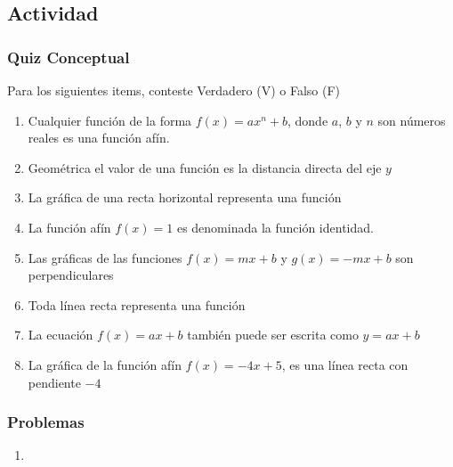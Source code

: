 \documentclass[letterpaper,11pt,twoside]{article}
\begin{document}
\begin{multicols}{2}
 \subsection*{Actividad}
 \subsubsection*{Quiz Conceptual}
 Para los siguientes items, conteste Verdadero (V) o Falso (F)
 \begin{enumerate}
 \item Cualquier función de la forma $f(x)=ax^{n}+b$, donde $a$, $b$ y $n$ son números reales es una función afín.
 \item Geométrica el valor de una función es la distancia directa del eje $y$
 \item La gráfica de una recta horizontal representa una función
 \item La función afín $f(x)=1$ es denominada la función identidad.
 \item Las gráficas de las funciones $f(x)=mx+b$ y $g(x)=-mx+b$ son perpendiculares
 \item Toda línea recta representa una función
 \item La ecuación $f(x)=ax+b$ también puede ser escrita como $y=ax+b$
 \item La gráfica de la función afín $f(x)=-4x+5$, es una línea recta con pendiente $-4$
 \end{enumerate}
 \subsubsection*{Problemas}
 \begin{enumerate}
 \item 
 \end{enumerate}
 \end{multicols}
\end{document}
